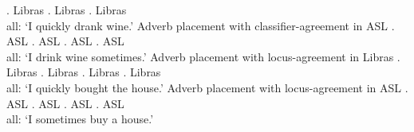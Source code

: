 \documentclass[output=paper]{langscibook}
\begin{document}
    \ex 
        \laszHs{\laszClaw}  \textbf{}.
        \hfill \cmark Libras
    \ex 
         \textbf{} \laszHs{\laszClaw}.
        \hfill \cmark Libras
    \ex 
        \laszHs{\laszClaw} \textbf{}. 
        \hfill \cmark Libras
        \\ 
        \glt all: ‘I quickly drank wine.’
    \z 
\ex 
    \label{lasz:ex:25}
    Adverb placement with classifier-agreement in ASL
    \ea 
         \textbf{} \laszHs{\laszClaw} .
        \hfill \cmark ASL
    \ex 
        \laszHs{\laszClaw}  \textbf{}.
        \hfill \cmark ASL
    \ex 
         \textbf{} \laszHs{\laszClaw}.
        \hfill \cmark ASL
    \ex 
        \laszHs{\laszClaw} \textbf{}. 
        \hfill \cmark ASL
        \\ 
        \glt all: ‘I drink wine sometimes.’
    \z 
\ex 
    \label{lasz:ex:26}
    Adverb placement with locus-agreement in Libras
    \ea 
         \textbf{}  .
        \hfill \cmark Libras
    \ex 
           \textbf{}.
        \hfill \cmark Libras
    \ex 
         \textbf{}  .
        \hfill \cmark Libras
    \ex 
          \textbf{}. 
        \hfill \cmark Libras
        \\ 
        \glt all: ‘I quickly bought the house.’
    \z 
\ex
    \label{lasz:ex:27}
    Adverb placement with locus-agreement in ASL
    \ea 
         \textbf{}  .
        \hfill \cmark ASL
    \ex 
           \textbf{}.
        \hfill \cmark ASL
    \ex 
         \textbf{}  .
        \hfill \cmark ASL
    \ex 
          \textbf{}. 
        \hfill \cmark ASL
        \\ 
        all: `I sometimes buy a house.' 
    \z 
\z 
\end{document}
